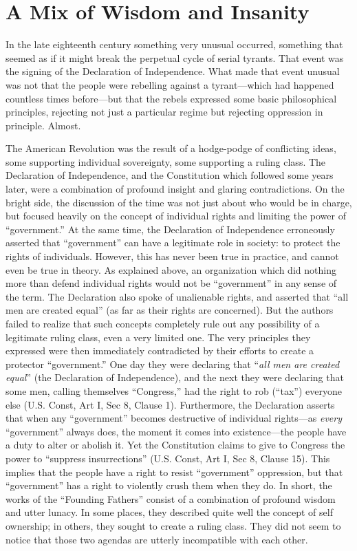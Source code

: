 \documentclass{book}
\begin{document}
\section{A Mix of Wisdom and Insanity}

In the late eighteenth century something very unusual occurred, something that seemed as if it might break the perpetual cycle of serial tyrants. That event was the signing of the Declaration of Independence. What made that event unusual was not that the people were rebelling against a tyrant---which had happened countless times before---but that the rebels expressed some basic philosophical principles, rejecting not just a particular regime but rejecting oppression in principle. Almost.

The American Revolution was the result of a hodge-podge of conflicting ideas, some supporting individual sovereignty, some supporting a ruling class. The Declaration of Independence, and the Constitution which followed some years later, were a combination of profound insight and glaring contradictions. On the bright side, the discussion of the time was not just about who would be in charge, but focused heavily on the concept of individual rights and limiting the power of \enquote{government.} At the same time, the Declaration of Independence erroneously asserted that \enquote{government} can have a legitimate role in society: to protect the rights of individuals. However, this has never been true in practice, and cannot even be true in theory. As explained above, an organization which did nothing more than defend individual rights would not be \enquote{government} in any sense of the term. The Declaration also spoke of unalienable rights, and asserted that \enquote{all men are created equal} (as far as their rights are concerned). But the authors failed to realize that such concepts completely rule out any possibility of a legitimate ruling class, even a very limited one. The very principles they expressed were then immediately contradicted by their efforts to create a protector \enquote{government.} One day they were declaring that \enquote{\emph{all men are created equal}} (the Declaration of Independence), and the next they were declaring that some men, calling themselves \enquote{Congress,} had the right to rob (\enquote{tax}) everyone else (U.S. Const, Art I, Sec 8, Clause 1). Furthermore, the Declaration asserts that when any \enquote{government} becomes destructive of individual rights---as \emph{every} \enquote{government} always does, the moment it comes into existence---the people have a duty to alter or abolish it. Yet the Constitution claims to give to Congress the power to \enquote{suppress insurrections} (U.S. Const, Art I, Sec 8, Clause 15). This implies that the people have a right to resist \enquote{government} oppression, but that \enquote{government} has a right to violently crush them when they do. In short, the works of the \enquote{Founding Fathers} consist of a combination of profound wisdom and utter lunacy. In some places, they described quite well the concept of self ownership; in others, they sought to create a ruling class. They did not seem to notice that those two agendas are utterly incompatible with each other.
\end{document}
